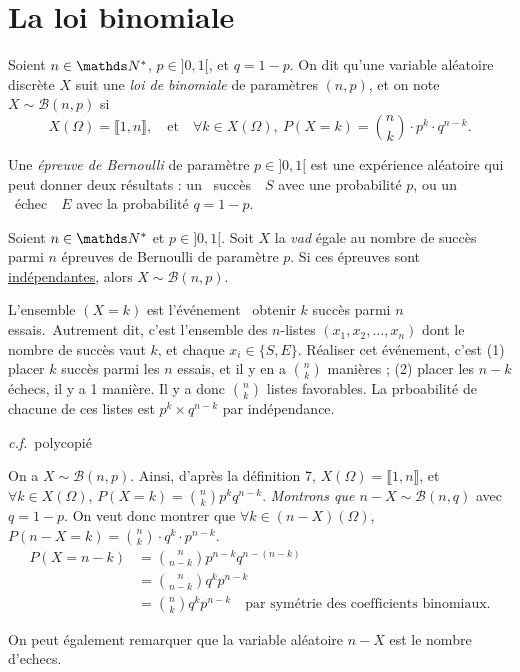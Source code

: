 \section{La loi binomiale}

\begin{defn}
  Soient $n \in \N^{*}$, $p \in {]0, 1[}$, et $q = 1 - p$. On dit qu'une variable aléatoire discrète $X$ suit une \textit{loi de binomiale} de paramètres $(n,p)$, et on note $X \sim \mathcal{B}(n,p)$ si \[
    X(\Omega) = \llbracket 1,n\rrbracket,\quad\text{et}\quad\forall k \in X(\Omega),\: P(X = k) = {n \choose k}\cdot p^{k}\cdot q^{n-k}.
  \]

  Une \textit{épreuve de Bernoulli} de paramètre $p \in {]0, 1[}$ est une expérience aléatoire qui peut donner deux résultats : un \guillemotleft~succès~\guillemotright\ $S$ avec une probabilité $p$, ou un \guillemotleft~échec~\guillemotright\ $E$ avec la probabilité $q = 1 - p$.
\end{defn}


\begin{prop}
  Soient $n \in \N^{*}$ et $p \in {]0, 1[}$. Soit $X$ la \textit{vad} égale au nombre de succès parmi $n$ épreuves de Bernoulli de paramètre $p$. Si ces épreuves sont \ul{indépendantes}, alors $X \sim \mathcal{B}(n,p)$.
\end{prop}

\begin{prv}
  L'ensemble $(X = k)$ est l'événement \guillemotleft~obtenir $k$ succès parmi $n$ essais.~\guillemotright\@ Autrement dit, c'est l'ensemble des $n$-listes $(x_{1},x_{2},\ldots,x_{n})$ dont le nombre de succès vaut $k$, et chaque $x_{i} \in \{S,E\}$.
  Réaliser cet événement, c'est (1) placer $k$ succès parmi les $n$ essais, et il y en a ${n\choose k}$ manières ; (2) placer les $n-k$ échecs, il y a 1 manière. Il y a donc ${n\choose k}$ listes favorables.
  La prboabilité de chacune de ces listes est $p^{k} \times q^{n-k}$ par indépendance.
\end{prv}

\begin{exm}
  \textit{c.f.}\ polycopié
\end{exm}

\begin{exo}
  On a $X \sim \mathcal{B}(n,p)$.
  Ainsi, d'après la définition 7, $X(\Omega) = \llbracket 1,n \rrbracket$, et $\forall k \in X(\Omega)$, $P(X = k) = {n\choose k} p^{k} q^{n - k}$. \textsl{Montrons que $n - X \sim \mathcal{B}(n, q)$} avec $q = 1 - p$.
  On veut donc montrer que $\forall k \in (n - X)(\Omega)$, $P(n - X = k) = {n \choose k}\cdot q^{k}\cdot p^{n-k}$.
  \begin{align*}
    P(X = n-k) &= {n \choose n - k} p^{n-k} q^{n-(n-k)}\\
               &= {n\choose n-k} q^{k} p^{n-k}\\
               &={n \choose k} q^{k} p^{n-k}\quad\text{par symétrie des coefficients binomiaux}.
  \end{align*}

  On peut également remarquer que la variable aléatoire $n - X$ est le nombre d'echecs.
\end{exo}


